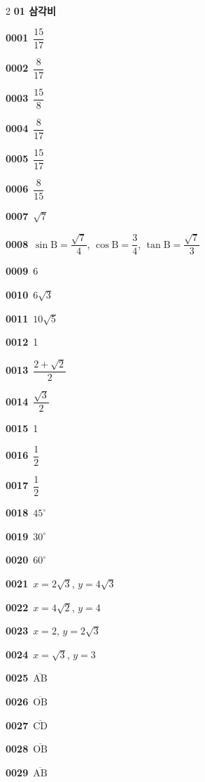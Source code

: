 \documentclass[10pt,a4paper]{article}
\newcommand{\pt}[1]{\mathrm{#1}}
\newcommand{\seg}[1]{\overline{\mathrm{#1}}}
\begin{document}
\begin{multicols}{2}\small
\noindent\textbf{01 삼각비}\par\smallskip
\noindent\textbf{0001}\ $\dfrac{15}{17}$\par
\noindent\textbf{0002}\ $\dfrac{8}{17}$\par
\noindent\textbf{0003}\ $\dfrac{15}{8}$\par
\noindent\textbf{0004}\ $\dfrac{8}{17}$\par
\noindent\textbf{0005}\ $\dfrac{15}{17}$\par
\noindent\textbf{0006}\ $\dfrac{8}{15}$\par
\noindent\textbf{0007}\ $\sqrt{7}$\par
\noindent\textbf{0008}\ $\sin\pt{B}=\dfrac{\sqrt{7}}{4}$, $\cos\pt{B}=\dfrac{3}{4}$, $\tan\pt{B}=\dfrac{\sqrt{7}}{3}$\par
\noindent\textbf{0009}\ 6\par
\noindent\textbf{0010}\ $6\sqrt{3}$\par
\noindent\textbf{0011}\ $10\sqrt{5}$\par
\noindent\textbf{0012}\ 1\par
\noindent\textbf{0013}\ $\dfrac{2+\sqrt{2}}{2}$\par
\noindent\textbf{0014}\ $\dfrac{\sqrt{3}}{2}$\par
\noindent\textbf{0015}\ 1\par
\noindent\textbf{0016}\ $\dfrac{1}{2}$\par
\noindent\textbf{0017}\ $\dfrac{1}{2}$\par
\noindent\textbf{0018}\ $45^\circ$\par
\noindent\textbf{0019}\ $30^\circ$\par
\noindent\textbf{0020}\ $60^\circ$\par
\noindent\textbf{0021}\ $x=2\sqrt{3}$, $y=4\sqrt{3}$\par
\noindent\textbf{0022}\ $x=4\sqrt{2}$, $y=4$\par
\noindent\textbf{0023}\ $x=2$, $y=2\sqrt{3}$\par
\noindent\textbf{0024}\ $x=\sqrt{3}$, $y=3$\par
\noindent\textbf{0025}\ $\seg{AB}$\par
\noindent\textbf{0026}\ $\seg{OB}$\par
\noindent\textbf{0027}\ $\seg{CD}$\par
\noindent\textbf{0028}\ $\seg{OB}$\par
\noindent\textbf{0029}\ $\seg{AB}$\par

\end{multicols}
\end{document}

